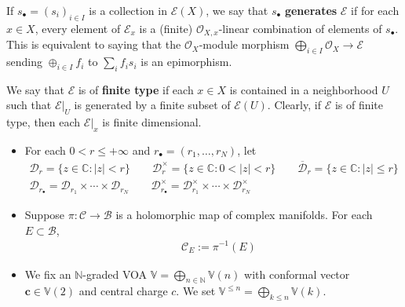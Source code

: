 \documentclass[11pt,b5paper,notitlepage]{article}
\theoremstyle{definition}
\theoremstyle{plain}
\newcommand{\mc}{\mathcal}
\newcommand{\ovl}{\overline}
\newcommand{\scr}{\mathscr}
\newcommand{\blt}{\bullet}
\newcommand{\Vbb}{\mathbb V}
\newcommand{\Cbb}{\mathbb C}
\newcommand{\Nbb}{\mathbb N}
\newcommand{\cbf}{\mathbf c}
\newcommand{\<}{\left\langle}
\renewcommand{\>}{\right\rangle}
\newcommand{\MC}{\mathcal{C}}
\newcommand{\MB}{\mathcal{B}}
\newcommand{\MD}{\mathcal{D}}
\numberwithin{equation}{subsection}
\begin{document}
If $s_\blt=(s_i)_{i\in I}$ is a collection in $\scr E(X)$, we say that $s_\blt$ \textbf{generates} $\scr E$ if for each $x\in X$, every element of $\scr E_x$ is a (finite) $\mc O_{X,x}$-linear combination of elements of $s_\blt$. This is equivalent to saying that the $\mc O_X$-module morphism $\bigoplus_{i\in I}\mc O_X\rightarrow \scr E$ sending $\oplus_{i\in I}f_i$ to $\sum_i f_is_i$ is an epimorphism.

We say that $\scr E$ is of \textbf{finite type} if each $x\in X$ is contained in a neighborhood $U$ such that $\scr E|_U$ is generated by a finite subset of $\scr E(U)$. Clearly, if $\scr E$ is of finite type, then each $\scr E|_x$ is finite dimensional.

\begin{itemize}
\item For each $0<r\leq+\infty$ and $r_\blt=(r_1,\dots,r_N)$, let
\begin{gather*}
\mc D_r=\{z\in\Cbb:|z|<r\}\qquad \mc D_r^\times=\{z\in\Cbb:0<|z|<r\}\qquad\ovl{\mc D}_r=\{z\in\Cbb:|z|\leq r\}\\
\MD_{r_\blt}=\MD_{r_1}\times\cdots\times\MD_{r_N}\qquad \MD^\times_{r_\blt}=\MD^\times_{r_1}\times\cdots\times\MD^\times_{r_N}
\end{gather*}


    \item Suppose $\pi:\MC\rightarrow \MB$ is a holomorphic map of complex manifolds. For each $E\subset\MB$, 
    \begin{align*}
 \quad \MC_E:=\pi^{-1}(E)
    \end{align*}


\item We fix an $\Nbb$-graded VOA $\Vbb=\bigoplus_{n\in\Nbb}\Vbb(n)$ with conformal vector $\cbf\in\Vbb(2)$  and central charge $c$. We set $\Vbb^{\leq n}=\bigoplus_{k\leq n}\Vbb(k)$. 


\end{itemize}
\end{document}
